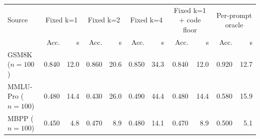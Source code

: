 \begin{tabular}{lrrrrrrrrrr}
\toprule
Source & \multicolumn{2}{c}{Fixed k=1} & \multicolumn{2}{c}{Fixed k=2} & \multicolumn{2}{c}{Fixed k=4} & \multicolumn{2}{c}{Fixed k=1 + code floor} & \multicolumn{2}{c}{Per-prompt oracle} \\
 & Acc. & s & Acc. & s & Acc. & s & Acc. & s & Acc. & s \\
\midrule
GSM8K ($n{=}100$) & 0.840 & 12.0 & 0.860 & 20.6 & 0.850 & 34.3 & 0.840 & 12.0 & 0.920 & 12.7 \\
MMLU-Pro ($n{=}100$) & 0.480 & 14.4 & 0.430 & 26.0 & 0.490 & 44.4 & 0.480 & 14.4 & 0.580 & 15.9 \\
MBPP ($n{=}100$) & 0.450 & 4.8 & 0.470 & 8.9 & 0.480 & 14.1 & 0.470 & 8.9 & 0.500 & 5.1 \\
\bottomrule
\end{tabular}
